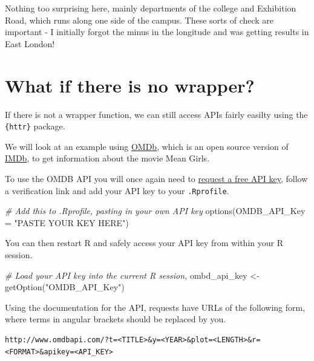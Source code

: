 \documentclass[
  12pt,
]{book}
\newenvironment{Shaded}{\begin{snugshade}}{\end{snugshade}}
\newcommand{\AttributeTok}[1]{\textcolor[rgb]{0.77,0.63,0.00}{#1}}
\newcommand{\CommentTok}[1]{\textcolor[rgb]{0.56,0.35,0.01}{\textit{#1}}}
\newcommand{\FunctionTok}[1]{\textcolor[rgb]{0.00,0.00,0.00}{#1}}
\newcommand{\NormalTok}[1]{#1}
\newcommand{\OtherTok}[1]{\textcolor[rgb]{0.56,0.35,0.01}{#1}}
\newcommand{\StringTok}[1]{\textcolor[rgb]{0.31,0.60,0.02}{#1}}
\begin{document}
Nothing too surprising here, mainly departments of the college and Exhibition Road, which runs along one side of the campus. These sorts of check are important - I initially forgot the minus in the longitude and was getting results in East London!

\hypertarget{what-if-there-is-no-wrapper}{%
\section{What if there is no wrapper?}\label{what-if-there-is-no-wrapper}}

If there is not a wrapper function, we can still access APIs fairly easilty using the \texttt{\{httr\}} package.

We will look at an example using \href{http://www.omdbapi.com/}{OMDb}, which is an open source version of \href{https://www.imdb.com/}{IMDb}, to get information about the movie Mean Girls.

To use the OMDB API you will once again need to \href{http://www.omdbapi.com/apikey.aspx}{request a free API key}, follow a verification link and add your API key to your \texttt{.Rprofile}.

\begin{Shaded}
\begin{Highlighting}[]
\CommentTok{\# Add this to .Rprofile, pasting in your own API key}
\FunctionTok{options}\NormalTok{(}\AttributeTok{OMDB\_API\_Key =} \StringTok{"PASTE YOUR KEY HERE"}\NormalTok{)}
\end{Highlighting}
\end{Shaded}

You can then restart R and safely access your API key from within your R session.

\begin{Shaded}
\begin{Highlighting}[]
\CommentTok{\# Load your API key into the current R session,}
\NormalTok{ombd\_api\_key }\OtherTok{\textless{}{-}} \FunctionTok{getOption}\NormalTok{(}\StringTok{"OMDB\_API\_Key"}\NormalTok{)}
\end{Highlighting}
\end{Shaded}

Using the documentation for the API, requests have URLs of the following form, where terms in angular brackets should be replaced by you.

\begin{verbatim}
http://www.omdbapi.com/?t=<TITLE>&y=<YEAR>&plot=<LENGTH>&r=<FORMAT>&apikey=<API_KEY>
\end{verbatim}
\end{document}
